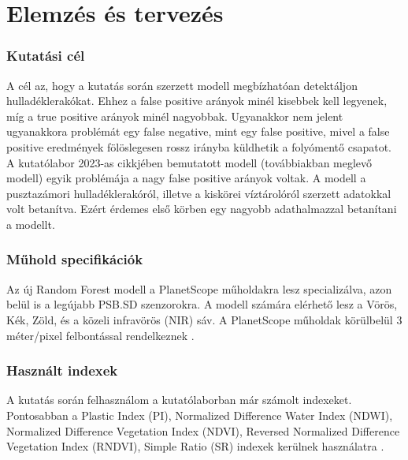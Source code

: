 \chapter{Elemzés és tervezés}
\label{ch:spec}

\subsection{Kutatási cél}
\label{ch:goals}

A cél az, hogy a kutatás során szerzett modell megbízhatóan detektáljon hulladéklerakókat. Ehhez a false positive arányok minél kisebbek kell legyenek, míg a true positive arányok minél nagyobbak. Ugyanakkor nem jelent ugyanakkora problémát egy false negative, mint egy false positive, mivel a false positive eredmények fölöslegesen rossz irányba küldhetik a folyómentő csapatot. 
A kutatólabor 2023-as cikkjében bemutatott modell (továbbiakban meglevő modell) egyik problémája a nagy false positive arányok voltak. A modell a pusztazámori hulladéklerakóról, illetve a kiskörei víztárolóról szerzett adatokkal volt betanítva. Ezért érdemes első körben egy nagyobb adathalmazzal betanítani a modellt.

\subsection{Műhold specifikációk}

Az új Random Forest modell a PlanetScope műholdakra lesz specializálva, azon belül is a legújabb PSB.SD szenzorokra\cite{planetsensors2024}. A modell számára elérhető lesz a Vörös, Kék, Zöld, és a közeli infravörös (NIR) sáv. A PlanetScope műholdak körülbelül 3 méter/pixel felbontással rendelkeznek \cite{planetresolution2024}.

\subsection{Használt indexek}

A kutatás során felhasználom a kutatólaborban már számolt indexeket. Pontosabban a Plastic Index (PI), Normalized Difference Water Index (NDWI), Normalized Difference Vegetation Index (NDVI), Reversed Normalized Difference Vegetation Index (RNDVI), Simple Ratio (SR) indexek kerülnek használatra .